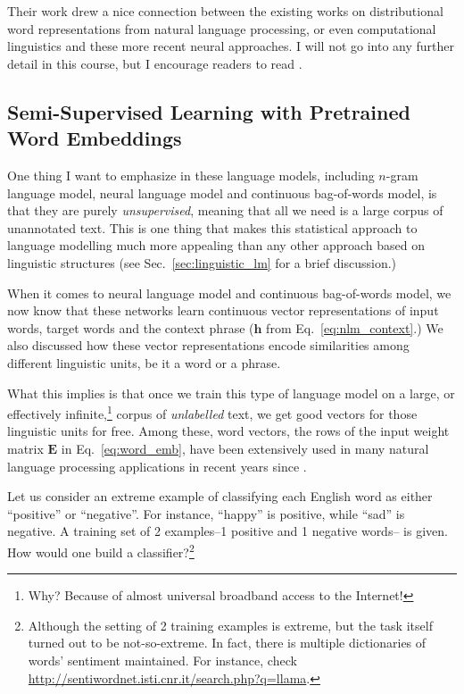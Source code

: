 \documentclass{report}
\newcommand{\vect}[1]{\mathbf{#1}}
\newcommand{\matr}[1]{\mathbf{#1}}
\newcommand{\vh}[0]{\vect{h}}
\newcommand{\mE}[0]{\matr{E}}
\begin{document}
Their work drew a nice connection between the existing works on distributional word
representations from natural language processing, or even computational
linguistics and these more recent neural approaches. I will not go into any
further detail in this course, but I encourage readers to read \cite{Omer2014}.


\subsection{Semi-Supervised Learning with
Pretrained Word Embeddings}

One thing I want to emphasize in these language models, including $n$-gram
language model, neural language model and continuous bag-of-words model, is that
they are purely {\em unsupervised}, meaning that all we need is a large corpus
of unannotated text. This is one thing that makes this statistical approach to
language modelling much more appealing than any other approach based on
linguistic structures (see Sec.~\ref{sec:linguistic_lm} for a brief discussion.) 

When it comes to neural language model and continuous bag-of-words model, we now
know that these networks learn continuous vector representations of input words,
target words and the context phrase ($\vh$ from Eq.~\eqref{eq:nlm_context}.) We
also discussed how these vector representations encode similarities among
different linguistic units, be it a word or a phrase. 

What this implies is that once we train this type of language model on a large,
or effectively infinite,\footnote{
    Why? Because of almost universal broadband access to the Internet!
}
corpus of {\em unlabelled} text, we get good vectors for those linguistic units
for free. Among these, word vectors, the rows of the input weight matrix $\mE$
in Eq.~\eqref{eq:word_emb}, have been extensively used in many natural language
processing applications in recent years since
\cite{turian2010word,collobert2011natural,mikolov2013efficient}.

Let us consider an extreme example of classifying each English word as either
``positive'' or ``negative''. For instance, ``happy'' is positive, while ``sad''
is negative. A training set of 2 examples--1 positive and 1 negative words-- is
given. How would one build a classifier?\footnote{
    Although the setting of 2 training examples is extreme, but the task itself
    turned out to be not-so-extreme. In fact, there is multiple dictionaries of
    words' sentiment maintained. For instance, check
    \url{http://sentiwordnet.isti.cnr.it/search.php?q=llama}.
}
\end{document}
